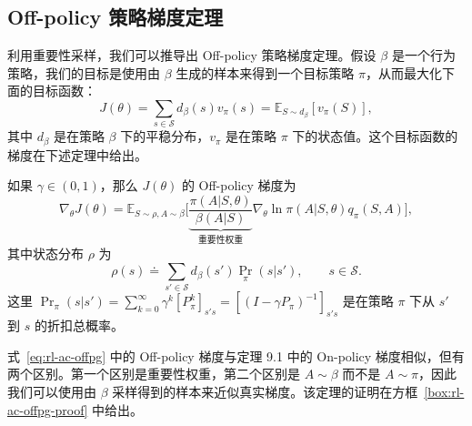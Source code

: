 \subsection{Off-policy 策略梯度定理}
\label{sec:rl-ac-offpg-theorem}

利用重要性采样，我们可以推导出 Off-policy 策略梯度定理。假设 $\beta$ 是一个行为策略，我们的目标是使用由 $\beta$ 生成的样本来得到一个目标策略 $\pi$，从而最大化下面的目标函数：
\[
J(\theta) = \sum_{s \in \mathcal{S}} d_{\beta}(s) v_{\pi}(s) = \mathbb{E}_{S \sim d_{\beta}}[v_{\pi}(S)],
\]
其中 $d_{\beta}$ 是在策略 $\beta$ 下的平稳分布，$v_{\pi}$ 是在策略 $\pi$ 下的状态值。这个目标函数的梯度在下述定理中给出。

\begin{theorem}\label{thm:rl-ac-offpg}
如果 $\gamma \in (0, 1)$，那么 $J(\theta)$ 的 Off-policy 梯度为
\begin{equation}
\nabla_{\theta} J(\theta) = \mathbb{E}_{S \sim \rho, A \sim \beta} \Big[ \underbrace{\frac{\pi(A | S, \theta)}{\beta(A | S)}}_{\text{重要性权重}} \nabla_{\theta} \ln \pi(A | S, \theta) q_{\pi}(S, A) \Big],
\label{eq:rl-ac-offpg}
\end{equation}
其中状态分布 $\rho$ 为
\[
\rho(s) \doteq \sum_{s' \in \mathcal{S}} d_{\beta}(s') \operatorname{Pr}_{\pi}(s | s'), \qquad s \in \mathcal{S}.
\]
这里 $\operatorname{Pr}_{\pi}(s | s') = \sum_{k=0}^{\infty} \gamma^{k} [P_{\pi}^{k}]_{s's} = \left[ (I - \gamma P_{\pi})^{-1} \right]_{s's}$ 是在策略 $\pi$ 下从 $s'$ 到 $s$ 的折扣总概率。
\end{theorem}

式~\eqref{eq:rl-ac-offpg} 中的 Off-policy 梯度与定理 9.1 中的 On-policy 梯度相似，但有两个区别。第一个区别是重要性权重，第二个区别是 $A \sim \beta$ 而不是 $A \sim \pi$，因此我们可以使用由 $\beta$ 采样得到的样本来近似真实梯度。该定理的证明在方框~\ref{box:rl-ac-offpg-proof} 中给出。

